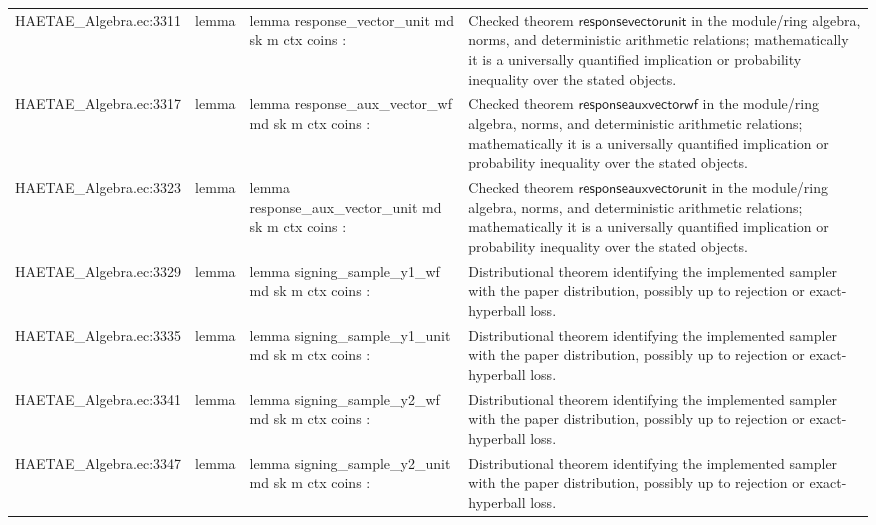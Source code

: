 \documentclass[10pt]{article}
\begin{document}
\begin{longtable}{L{0.11\textwidth}L{0.055\textwidth}L{0.385\textwidth}L{0.41\textwidth}}
HAETAE\_\allowbreak{}Algebra.\allowbreak{}ec:\allowbreak{}3311 & lemma & {\ttfamily\scriptsize lemma response\_\allowbreak{}vector\_\allowbreak{}unit md sk m ctx coins :} & Checked theorem $\mathsf{responsevectorunit}$ in the module/ring algebra, norms, and deterministic arithmetic relations; mathematically it is a universally quantified implication or probability inequality over the stated objects. \\
HAETAE\_\allowbreak{}Algebra.\allowbreak{}ec:\allowbreak{}3317 & lemma & {\ttfamily\scriptsize lemma response\_\allowbreak{}aux\_\allowbreak{}vector\_\allowbreak{}wf md sk m ctx coins :} & Checked theorem $\mathsf{responseauxvectorwf}$ in the module/ring algebra, norms, and deterministic arithmetic relations; mathematically it is a universally quantified implication or probability inequality over the stated objects. \\
HAETAE\_\allowbreak{}Algebra.\allowbreak{}ec:\allowbreak{}3323 & lemma & {\ttfamily\scriptsize lemma response\_\allowbreak{}aux\_\allowbreak{}vector\_\allowbreak{}unit md sk m ctx coins :} & Checked theorem $\mathsf{responseauxvectorunit}$ in the module/ring algebra, norms, and deterministic arithmetic relations; mathematically it is a universally quantified implication or probability inequality over the stated objects. \\
HAETAE\_\allowbreak{}Algebra.\allowbreak{}ec:\allowbreak{}3329 & lemma & {\ttfamily\scriptsize lemma signing\_\allowbreak{}sample\_\allowbreak{}y1\_\allowbreak{}wf md sk m ctx coins :} & Distributional theorem identifying the implemented sampler with the paper distribution, possibly up to rejection or exact-hyperball loss. \\
HAETAE\_\allowbreak{}Algebra.\allowbreak{}ec:\allowbreak{}3335 & lemma & {\ttfamily\scriptsize lemma signing\_\allowbreak{}sample\_\allowbreak{}y1\_\allowbreak{}unit md sk m ctx coins :} & Distributional theorem identifying the implemented sampler with the paper distribution, possibly up to rejection or exact-hyperball loss. \\
HAETAE\_\allowbreak{}Algebra.\allowbreak{}ec:\allowbreak{}3341 & lemma & {\ttfamily\scriptsize lemma signing\_\allowbreak{}sample\_\allowbreak{}y2\_\allowbreak{}wf md sk m ctx coins :} & Distributional theorem identifying the implemented sampler with the paper distribution, possibly up to rejection or exact-hyperball loss. \\
HAETAE\_\allowbreak{}Algebra.\allowbreak{}ec:\allowbreak{}3347 & lemma & {\ttfamily\scriptsize lemma signing\_\allowbreak{}sample\_\allowbreak{}y2\_\allowbreak{}unit md sk m ctx coins :} & Distributional theorem identifying the implemented sampler with the paper distribution, possibly up to rejection or exact-hyperball loss. \\

\end{longtable}
\end{document}
